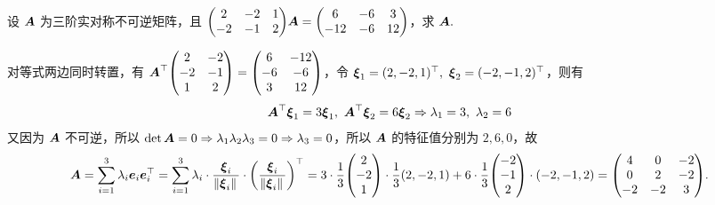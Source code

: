 \begin{example}
    设 $\vb*{A}$ 为三阶实对称不可逆矩阵，且 $\mqty(2&-2&1\\-2&-1&2)\vb*{A}=\mqty(6&-6&3\\-12&-6&12)$，求 $\vb*{A}.$
\end{example}
\begin{solution}
    对等式两边同时转置，有 $\vb*{A}^\top\mqty(2&-2\\-2&-1\\1&2)=\mqty(6&-12\\-6&-6\\3&12)$，令 $\vb*{\xi}_1=(2,-2,1)^\top,~\vb*{\xi}_2=(-2,-1,2)^\top$，则有 $$\vb*{A}^\top\vb*{\xi}_1=3\vb*{\xi}_1,~\vb*{A}^\top\vb*{\xi}_2=6\vb*{\xi}_2\Rightarrow \lambda_1=3,~\lambda_2=6$$
    又因为 $\vb*{A}$ 不可逆，所以 $\det\vb*{A}=0\Rightarrow \lambda_1\lambda_2\lambda_3=0\Rightarrow \lambda_3=0$，所以 $\vb*{A}$ 的特征值分别为 $2,6,0$，故
    $$\vb*{A}=\sum_{i=1}^{3}\lambda_i\vb*{e}_i\vb*{e}_i^\top=\sum_{i=1}^{3}\lambda_i\cdot\dfrac{\vb*{\xi}_i}{\norm*{\vb*{\xi}_i}}\cdot\qty(\dfrac{\vb*{\xi}_i}{\norm*{\vb*{\xi}_i}})^\top=3\cdot\dfrac{1}{3}\mqty(2\\-2\\1)\cdot\dfrac{1}{3}(2,-2,1)+6\cdot\dfrac{1}{3}\mqty(-2\\-1\\2)\cdot(-2,-1,2)=\mqty(4&0&-2\\0&2&-2\\-2&-2&3).$$
\end{solution}

